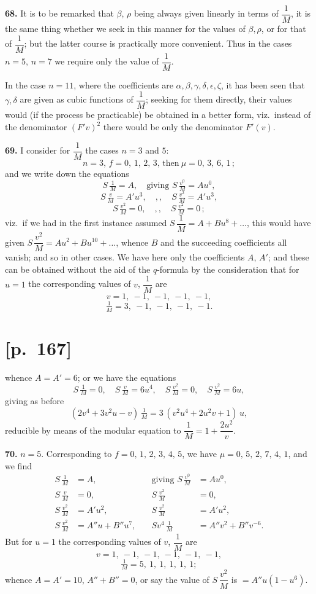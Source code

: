 \documentclass[11pt]{article}
\begin{document}
\medskip
\noindent\textbf{68.} It is to be remarked that $\beta$, $\rho$ being always given linearly in terms of $\dfrac{1}{M}$,
it is the same thing whether we seek in this manner for the values of $\beta,\rho$, or for
that of $\dfrac{1}{M}$; but the latter course is practically more convenient. Thus in the cases
$n=5,\,n=7$ we require only the value of $\dfrac{1}{M}$.

In the case $n=11$, where the coefficients are $\alpha,\beta,\gamma,\delta,\epsilon,\zeta$, it has been seen that
$\gamma,\delta$ are given as cubic functions of $\dfrac{1}{M}$; seeking for them directly, their values would
(if the process be practicable) be obtained in a better form, viz.\ instead of the
denominator $(F'v)^2$ there would be only the denominator $F'(v)$.

\medskip
\noindent\textbf{69.} I consider for $\dfrac{1}{M}$ the cases $n=3$ and $5$:
\[
n=3,\,f=0,\,1,\,2,\,3,\,\text{then}\ \mu=0,\,3,\,6,\,1\,;
\]
and we write down the equations
\[
S\,\tfrac{1}{M}=A,\quad\text{giving } S\,\tfrac{v^0}{M}=Au^0,
\]
\[
S\,\tfrac{v}{M}=A'u^3,\quad{,,}\quad S\,\tfrac{v^2}{M}=A'u^3,
\]
\[
S\,\tfrac{v^2}{M}=0,\quad{,,}\quad S\,\tfrac{v^2}{M}=0\,;
\]
viz.\ if we had in the first instance assumed $S\,\dfrac{1}{M}=A+Bu^8+\ldots$, this would have given
$S\,\dfrac{v^2}{M}=Au^2+Bu^{10}+\ldots$, whence $B$ and the succeeding coefficients all vanish; and so in
other cases. We have here only the coefficients $A$, $A'$; and these can be obtained
without the aid of the $q$-formula by the consideration that for $u=1$ the corresponding
values of $v$, $\dfrac{1}{M}$ are
\[
v=1,\ -1,\ -1,\ -1,\ -1,
\]
\[
\tfrac{1}{M}=3,\ -1,\ -1,\ -1,\ -1.
\]

\section*{[p.~167]}
whence $A=A'=6$; or we have the equations
\[
S\,\tfrac{1}{M}=0,\quad S\,\tfrac{v}{M}=6u^4,\quad S\,\tfrac{v^2}{M}=0,\quad S\,\tfrac{v^2}{M}=6u,
\]
giving as before
\[
(2v^4+3v^2u-v)\,\tfrac{1}{M}=3\,(v^2u^4+2u^2v+1)\,u,
\]
reducible by means of the modular equation to $\dfrac{1}{M}=1+\dfrac{2u^2}{v}$.

\medskip
\noindent\textbf{70.} $n=5$. Corresponding to $f=0,\,1,\,2,\,3,\,4,\,5$, we have $\mu=0,\,5,\,2,\,7,\,4,\,1$, and
we find
\begin{align*}
S\,\tfrac{1}{M}&=A,\quad &\text{giving } S\,\tfrac{v^0}{M}&=Au^0,\\
S\,\tfrac{v}{M}&=0,\quad &S\,\tfrac{v^2}{M}&=0,\\
S\,\tfrac{v^2}{M}&=A'u^2,\quad &S\,\tfrac{v^2}{M}&=A'u^2,\\
S\,\tfrac{v^2}{M}&=A''u+B''u^7,\quad &Sv^4\,\tfrac{1}{M}&=A''v^2+B''v^{-6}.
\end{align*}
But for $u=1$ the corresponding values of $v$, $\dfrac{1}{M}$ are
\[
v=1,\ -1,\ -1,\ -1,\ -1,\ -1,
\]
\[
\tfrac{1}{M}=5,\ 1,\ 1,\ 1,\ 1,\ 1;
\]
whence $A=A'=10$, $A''+B''=0$, or say the value of $S\,\dfrac{v^2}{M}$ is $=A''u(1-u^6)$.
\end{document}
